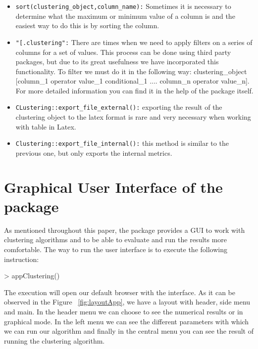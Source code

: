 \begin{itemize}
  \item \texttt{sort(clustering\_object,column\_name):} Sometimes it is necessary to determine what the maximum or minimum value of a column is and the easiest way to do this is by sorting the column.
  \item \texttt{"[.clustering":} There are times when we need to apply filters on a series of columns for a set of values. This process can be done using third party packages, but due to its great usefulness we have incorporated this functionality. To filter we must do it in the following way: clustering\_object [column\_1 operator value\_1 conditional\_1 .... column\_n operator value\_n]. For more detailed information you can find it in the help of the package itself.
  \item \texttt{CLustering::export\_file\_external():} exporting the result of the clustering object to the latex format is rare and very necessary when working with table in Latex.
  \item \texttt{Clustering::export\_file\_internal():} this method is similar to the previous one, but only exports the internal metrics.
\end{itemize}


\section{Graphical User Interface of the  package}

As mentioned throughout this paper, the  package provides a GUI to work with clustering algorithms and to be able to evaluate and run the results more comfortable. The way to run the user interface is to execute the following instruction:

\begin{Schunk}
\begin{Sinput}
> appClustering()
\end{Sinput}
\end{Schunk}

The execution will open our default browser with the interface. As it can be observed in the Figure ~\ref{fig:layoutApp}, we have a layout with header, side menu and main. In the header menu we can choose to see the numerical results or in graphical mode. In the left menu we can see the different parameters with which we can run our algorithm and finally in the central menu you can see the result of running the clustering algorithm.

